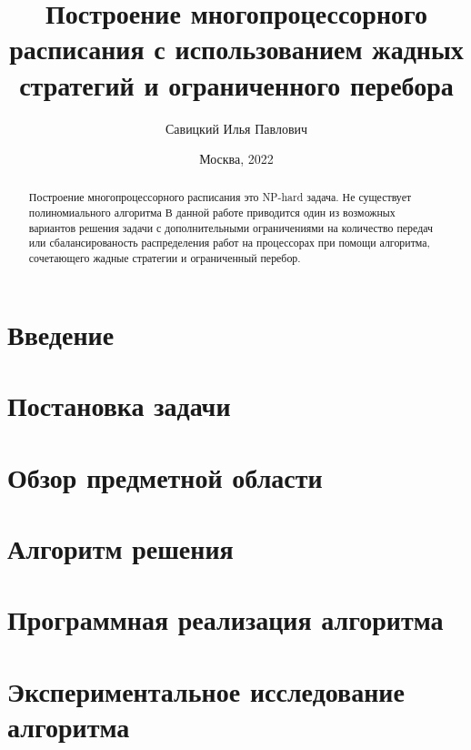 \documentclass[12pt]{article}
\author{Савицкий Илья Павлович}
\title{Построение многопроцессорного расписания с использованием жадных стратегий и ограниченного перебора}
\date{Москва, 2022}
\begin{document}

\newpage
\begin{abstract}
    Построение многопроцессорного расписания это NP-hard задача. Не существует полиномиального алгоритма  В данной работе приводится один из возможных вариантов решения задачи с дополнительными ограничениями на количество передач или сбалансированость распределения работ на процессорах при помощи алгоритма, сочетающего жадные стратегии и ограниченный перебор.
\end{abstract}
\newpage
\tableofcontents
\newpage
\section{Введение}

\newpage
\section{Постановка задачи}

\newpage
\section{Обзор предметной области}


\newpage
\section{Алгоритм решения}


\newpage
\section{Программная реализация алгоритма}


\newpage
\section{Экспериментальное исследование алгоритма}

\end{document}
